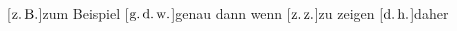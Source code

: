 \begin{acronym}
[\ensuremath{\tx{z.\,B.}\xspace}]{zum Beispiel}
[\ensuremath{\mbox{g.\,d.\,w.}\xspace}]{genau dann wenn}
[\ensuremath{\mbox{z.\,z.}\xspace}]{zu zeigen}
[\ensuremath{\mbox{d.\,h.}\xspace}]{daher}
\end{acronym}
